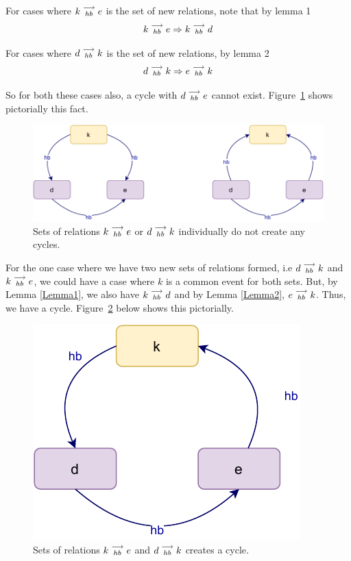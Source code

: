     For cases where $k\stackrel{\longrightarrow}{_{hb}}e$ is the set of new relations, note that by lemma 1
    \[
        k\stackrel{\longrightarrow}{_{hb}}e \Rightarrow k\stackrel{\longrightarrow}{_{hb}}d
    \]

    For cases where $d\stackrel{\longrightarrow}{_{hb}}k$ is the set of new relations, by lemma 2
    \[
        d\stackrel{\longrightarrow}{_{hb}}k \Rightarrow e\stackrel{\longrightarrow}{_{hb}}k
    \]

    So for both these cases also, a cycle with $d\stackrel{\longrightarrow}{_{hb}}e$ cannot exist. 
    Figure~\ref{reord:cycle(b)} shows pictorially this fact. 
    \begin{figure}[H]
        \centering
        \includegraphics[scale=0.7]{5.InstructionReordering/4.ValidReorderingCandidate/ProofParts/Part3/part3(c).pdf}
        \caption{Sets of relations $k\stackrel{\longrightarrow}{_{hb}}e$ or $d\stackrel{\longrightarrow}{_{hb}}k$ individually do not create any cycles.}
        \label{reord:cycle(b)}
    \end{figure}

    For the one case where we have two new sets of relations formed, i.e $d\stackrel{\longrightarrow}{_{hb}}k$ and $k\stackrel{\longrightarrow}{_{hb}}e$, we could have a case where $k$ is a common event for both sets. But, by Lemma \ref{Lemma1}, we also have $k\stackrel{\longrightarrow}{_{hb}}d$ and by Lemma \ref{Lemma2}, $e\stackrel{\longrightarrow}{_{hb}}k$\footnotemark. Thus, we have a cycle. Figure~\ref{reord:cycle(c)} below shows this pictorially.
    \begin{figure}[H]
        \centering
        \includegraphics[scale=0.7]{5.InstructionReordering/4.ValidReorderingCandidate/ProofParts/Part3/part3(d).pdf}
        \caption{Sets of relations $k\stackrel{\longrightarrow}{_{hb}}e$ and $d\stackrel{\longrightarrow}{_{hb}}k$ creates a cycle.}
        \label{reord:cycle(c)}
    \end{figure}

